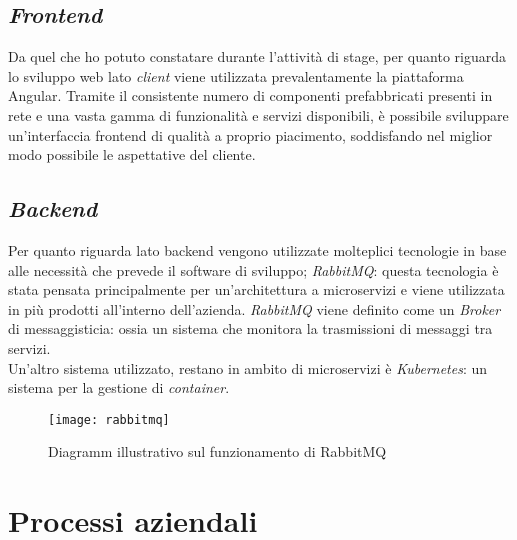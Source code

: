 \subsection{\textit{Frontend}}
Da quel che ho potuto constatare durante l'attività di stage, per quanto riguarda lo sviluppo web lato \textit{client} viene utilizzata prevalentamente la piattaforma Angular. Tramite il consistente numero di componenti prefabbricati presenti in rete e una vasta gamma di funzionalità e servizi disponibili, è possibile sviluppare un'interfaccia frontend di qualità a proprio piacimento, soddisfando nel miglior modo possibile le aspettative del cliente.

\subsection{\textit{Backend}}
Per quanto riguarda lato backend vengono utilizzate molteplici tecnologie in base alle necessità che prevede il software di sviluppo;  \textit{RabbitMQ}: questa tecnologia è stata pensata principalmente per un'architettura a microservizi e viene utilizzata in più prodotti all'interno dell'azienda. \textit{RabbitMQ} viene definito come un \textit{Broker} di messaggisticia: ossia un sistema che monitora la trasmissioni di messaggi tra servizi.\\ Un'altro sistema utilizzato, restano in ambito di microservizi è \textit{Kubernetes}: un sistema per la gestione di \textit{container}.

\begin{figure}[!h] 
	\centering 
	\texttt{[image: rabbitmq]} 
	\caption{Diagramm illustrativo sul funzionamento di RabbitMQ}
\end{figure}
\section {Processi aziendali}
